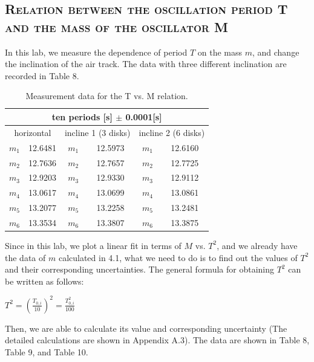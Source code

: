 \documentclass[a4paper,12pt]{article}
\begin{document}
\subsection{\textsc{Relation between the oscillation period T and the mass of the oscillator M}}
In this lab, we measure the dependence of period $T$ on the mass $m$, and change the inclination of the air track. The data with three different inclination are recorded in Table 8.

\begin{table}[h]
\begin{center}
\begin{tabular}{|c|c||c|c||c|c|}
\hline
\multicolumn{6}{|c|}{ten periods [s] $\pm$ 0.0001[s] } \\
\hline
\multicolumn{2}{|c||}{horizontal} & \multicolumn{2}{|c||}{incline 1 (3 disks)} & \multicolumn{2}{|c|}{incline 2 (6 disks)}\\
\hline
$m_1$ & 12.6481 & $m_1$ & 12.5973 & $m_1$ & 12.6160 \\
$m_2$ & 12.7636 & $m_2$ & 12.7657 & $m_2$ & 12.7725 \\
$m_3$ & 12.9203 & $m_3$ & 12.9330 & $m_3$ & 12.9112 \\
$m_4$ & 13.0617 & $m_4$ & 13.0699 & $m_4$ & 13.0861 \\
$m_5$ & 13.2077 & $m_5$ & 13.2258 & $m_5$ & 13.2481 \\
$m_6$ & 13.3534 & $m_6$ & 13.3807 & $m_6$ & 13.3875 \\
\hline
\end{tabular}
\end{center}
\caption{Measurement data for the T vs. M relation.}
\end{table}
\par Since in this lab, we plot a linear fit in terms of $M$ vs. $T^2$, and we already have the data of $m$ calculated in 4.1, what we need to do is to find out the values of $T^2$ and their corresponding uncertainties. The general formula for obtaining $T^2$ can be written as follows:
\begin{center}
$\displaystyle T^2 = (\frac{T_{0,i}}{10})^2 = \frac{T_{0,i}^2}{100}$
\end{center}
Then, we are able to calculate its value and corresponding uncertainty (The detailed calculations are shown in Appendix A.3). The data are shown in Table 8, Table 9, and Table 10.
\end{document}

